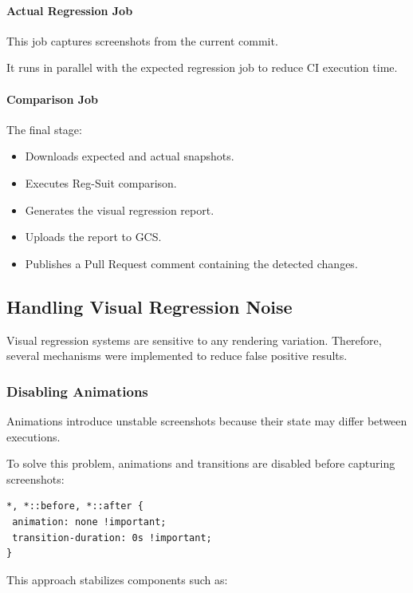 \paragraph{Actual Regression Job}

This job captures screenshots from the current commit.

It runs in parallel with the expected regression job to reduce CI execution time.


\paragraph{Comparison Job}

The final stage:

\begin{itemize}
    \item Downloads expected and actual snapshots.
    \item Executes Reg-Suit comparison.
    \item Generates the visual regression report.
    \item Uploads the report to GCS.
    \item Publishes a Pull Request comment containing the detected changes.
\end{itemize}


\subsection{Handling Visual Regression Noise}

Visual regression systems are sensitive to any rendering variation. Therefore, several mechanisms were implemented to reduce false positive results.


\subsubsection{Disabling Animations}

Animations introduce unstable screenshots because their state may differ between executions.

To solve this problem, animations and transitions are disabled before capturing screenshots:

\begin{lstlisting}[]
*, *::before, *::after {
 animation: none !important;
 transition-duration: 0s !important;
}
\end{lstlisting}

This approach stabilizes components such as:


